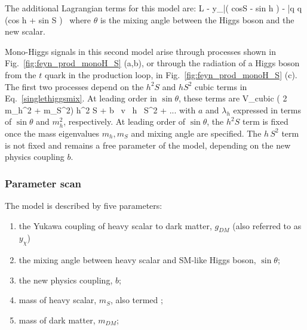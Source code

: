 The additional Lagrangian terms for this model are: 
\be \label{LintScalar2}
L \supset - y_\chi \bar\chi \chi (  cos\theta\:S - sin\theta\: h ) -  \bar q q (cos\theta\: h + sin\theta\: S )  \,
\ee
where $\theta$ is the mixing angle between the Higgs boson and the new scalar. 

Mono-Higgs signals in this second model arise through processes shown in Fig.~\ref{fig:feyn_prod_monoH_S} (a,b), or through 
the radiation of a Higgs boson from the  $t$ quark in the production loop, in Fig.~\ref{fig:feyn_prod_monoH_S} (c). 
The first two processes depend on the $h^2 S$ and $h S^2$ cubic terms in Eq.~\eqref{singlethiggsmix}.  
At leading order in $\sin\theta$, these terms are
\be
V_{\rm cubic} \approx {} ( 2 m_h^2 + m_S^2) h^2 S  + b \, v \, h \, S^2 + ...
\ee
with $a$ and $\lambda_h$ expressed in terms of $\sin\theta$ and $m_h^2$, respectively.  
At leading order of $\sin\theta$, the $h^2 S$ term is fixed once the mass eigenvalues $m_h, m_S$ 
and mixing angle are specified.  The $h\,S^2$ term is not fixed and remains a free parameter of the model, depending on 
the new physics coupling $b$. 

\subsubsection{Parameter scan}

The model is described by five parameters: 

\begin{enumerate}
	\item the Yukawa coupling of heavy scalar to dark matter, $g_{DM}$ (also referred to as $y_\chi$) 
	\item the mixing angle between heavy scalar and SM-like Higgs boson, $\sin\theta$;
	\item the new physics coupling, $b$;
	\item mass of heavy scalar, $m_{S}$, also termed \mmed;
	\item mass of dark matter, $m_{DM}$;
\end{enumerate}

